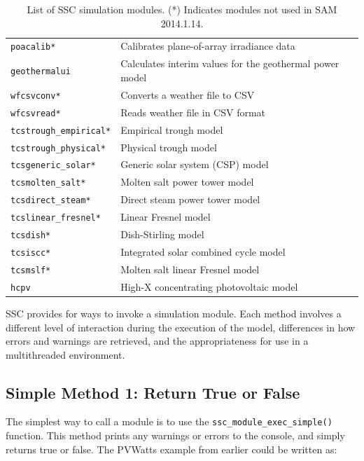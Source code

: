 \documentclass{scrartcl} %
\begin{document}
\begin{table}
\begin{center}
\begin{tabular}{ll}
\texttt{poacalib*} & Calibrates plane-of-array irradiance data\\
\texttt{geothermalui} & Calculates interim values for the geothermal power model\\
\texttt{wfcsvconv*} & Converts a weather file to CSV\\
\texttt{wfcsvread*} & Reads weather file in CSV format\\
\texttt{tcstrough\_empirical*} & Empirical trough model\\
\texttt{tcstrough\_physical*} & Physical trough model\\
\texttt{tcsgeneric\_solar*} & Generic solar system (CSP) model\\
\texttt{tcsmolten\_salt*} & Molten salt power tower model\\
\texttt{tcsdirect\_steam*} & Direct steam power tower model\\
\texttt{tcslinear\_fresnel*} & Linear Fresnel model\\
\texttt{tcsdish*} & Dish-Stirling model\\
\texttt{tcsiscc*} & Integrated solar combined cycle model\\
\texttt{tcsmslf*} & Molten salt linear Fresnel model\\
\texttt{hcpv} & High-X concentrating photovoltaic model\\
\end{tabular}
\label{tab_modules}
\caption{List of SSC simulation modules. (*) Indicates modules not used in SAM 2014.1.14.}
\end{center}
\end{table}

SSC provides for ways to invoke a simulation module.  Each method involves a different level of interaction during the execution of the model, differences in how errors and warnings are retrieved, and the appropriateness for use in a multithreaded environment.

\subsection{Simple Method 1: Return True or False}

The simplest way to call a module is to use the \texttt{ssc\_module\_exec\_simple()} function.  This method prints any warnings or errors to the console, and simply returns true or false. The PVWatts example from earlier could be written as:
\end{document}
